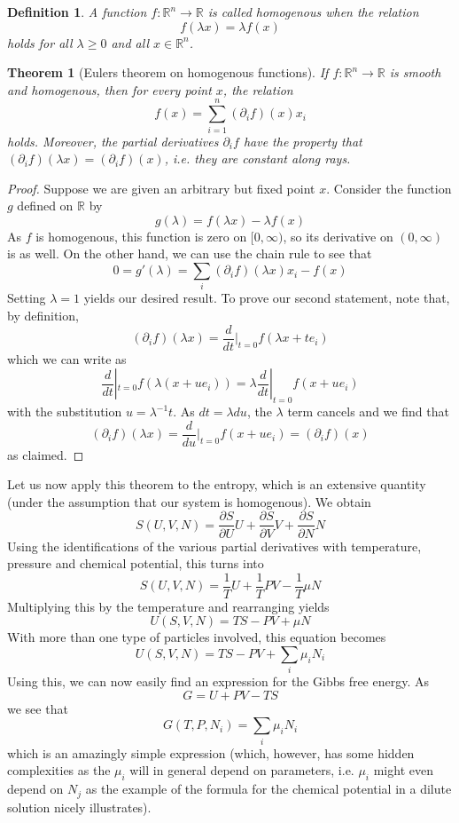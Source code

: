 \documentclass[a4paper, draft]{report}
\numberwithin{section}{chapter}
\numberwithin{equation}{chapter}
\theoremstyle{own}
\newtheorem{thm}{Theorem}[section]
\newtheorem{defn}{Definition}[section]
\theoremstyle{remark}
\newcommand{\R}{\mathbb{R}}
\begin{document}
\begin{defn}
A function $f \colon \R^n \rightarrow \R$ is called {\em homogenous} when the relation
$$
f(\lambda x ) = \lambda f(x)
$$
holds for all $\lambda \geq 0$ and all $x \in \R^n$.
\end{defn}


\begin{thm}[Eulers theorem on homogenous functions]\label{thm:euler}
	If $f \colon \R^n \rightarrow \R$ is smooth and homogenous, then for every point $x$, the relation
	$$
	f(x) = \sum_{i=1}^n (\partial_i f)(x) x_i
	$$
	holds. Moreover, the partial derivatives $\partial_i f$ have the property that $(\partial_i f)(\lambda x) = (\partial_i f)(x)$, i.e. they are constant along rays.
\end{thm}


\begin{proof}
Suppose we are given an arbitrary but fixed point $x$. Consider the function $g$ defined on $\R$ by
$$
g(\lambda) = f(\lambda x) - \lambda f(x)
$$
As $f$ is homogenous, this function is zero on $[0, \infty)$, so its derivative on $(0, \infty)$ is as well. On the other hand, we can use the chain rule to see that
$$
0 = g'(\lambda) = \sum_i  (\partial_i f)(\lambda x) x_i - f(x)
$$
Setting $\lambda = 1$ yields our desired result. To prove our second statement, note that, by definition,
$$
(\partial_i f)(\lambda x) = \frac{d}{dt}|_{t=0} f(\lambda x + t e_i)
$$
which we can write as
$$
\frac{d}{dt}|_{t=0} f(\lambda (x + u e_i)) = \lambda \frac{d}{dt}|_{t=0} f(x + u e_i)
$$
with the substitution $u = \lambda^{-1} t$. As $dt = \lambda du$, the $\lambda$ term cancels and we find that 
$$
(\partial_i f)(\lambda x) = \frac{d}{du}|_{t=0} f(x + u e_i) = (\partial_i f)( x)
$$
as claimed.
\end{proof}

Let us now apply this theorem to the entropy, which is an extensive quantity (under the assumption that our system is homogenous). We obtain
$$
S(U, V, N) = \frac{\partial S}{\partial U} U + \frac{\partial S}{\partial V} V + \frac{\partial S}{\partial N} N
$$
Using the identifications of the various partial derivatives with temperature, pressure and chemical potential, this turns into
$$
S(U, V, N) = \frac{1}{T} U + \frac{1}{T} P V - \frac{1}{T} \mu N 
$$
Multiplying this by the temperature and rearranging yields
$$
U(S, V, N) = TS - PV + \mu N
$$
With more than one type of particles involved, this equation becomes
$$
U(S, V, N) = TS - PV + \sum_i \mu_i N_i
$$
Using this, we can now easily find an expression for the Gibbs free energy. As 
$$
G = U + PV - TS
$$
we see that
$$
G(T, P, N_i) = \sum_i \mu_i N_i
$$
which is an amazingly simple expression (which, however, has some hidden complexities as the $\mu_i$ will in general depend on parameters, i.e. $\mu_i$ might even depend on $N_j$ as the example of the formula for the chemical potential in a dilute solution nicely illustrates). 
\end{document}

